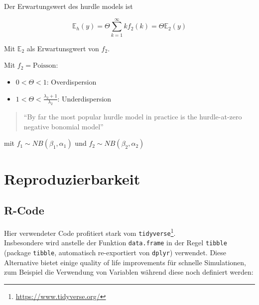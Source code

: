\documentclass[ngerman,a4paper,]{scrartcl}
\renewcommand{\href}[2]{#2\footnote{\url{#1}}}
\providecommand{\tightlist}{%
  \setlength{\itemsep}{0pt}\setlength{\parskip}{0pt}}
\let\rmarkdownfootnote\footnote%
\def\footnote{\protect\rmarkdownfootnote}
\theoremstyle{definition}
\theoremstyle{definition}
\theoremstyle{definition}
\theoremstyle{remark}
\begin{document}
Der Erwartungswert des hurdle models ist

\[
  \mathbb{E}_h(y) = \Theta \sum_{k=1}^\infty k f_2(k) = \Theta \mathbb{E}_2(y)
\]

Mit \(\mathbb{E}_2\) als Erwartunsgwert von \(f_2\).

Mit \(f_2 = \mathrm{Poisson}\):

\begin{itemize}
\tightlist
\item
  \(0 < \Theta < 1\): Overdispersion\\
\item
  \(1 < \Theta < \frac{\lambda_2 + 1}{\lambda_2}\): Underdispersion
\end{itemize}

\begin{quote}
\enquote{By far the most popular hurdle model in practice is the hurdle-at-zero negative bonomial model}
\citep[p.~183]{winkelmannEconometricAnalysisCount2010}
\end{quote}

mit \(f_1 \sim NB(\beta_1, \alpha_1)\) und \(f_2 \sim NB(\beta_2, \alpha_2)\)

\hypertarget{repro}{%
\section{Reproduzierbarkeit}\label{repro}}

\hypertarget{r-code}{%
\subsection{R-Code}\label{r-code}}

Hier verwendeter Code profitiert stark vom \href{https://www.tidyverse.org/}{\texttt{tidyverse}}.\\
Insbesondere wird anstelle der Funktion \texttt{data.frame} in der Regel \texttt{tibble} (package \texttt{tibble}, automatisch re-exportiert von \texttt{dplyr}) verwendet. Diese Alternative bietet einige quality of life improvements für schnelle Simulationen, zum Beispiel die Verwendung von Variablen während diese noch definiert werden:
\end{document}
